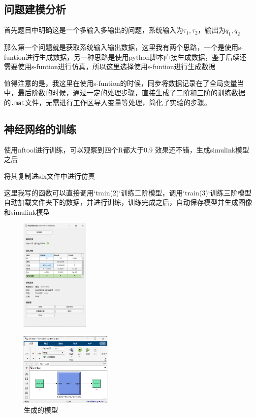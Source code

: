 \documentclass[12pt,a4paper,UTF8]{article}
\begin{document}
\subsection{问题建模分析}

首先题目中明确这是一个多输入多输出的问题，系统输入为$\tau_1, \tau_2$，输出为$q_1, q_2$

那么第一个问题就是获取系统输入输出数据，这里我有两个思路，一个是使用s-funtion进行生成数据，另一种思路是使用python脚本直接生成数据，鉴于后续还需要使用s-funtion进行仿真，所以这里选择使用s-funtion进行生成数据


值得注意的是，我这里在使用s-funtion的时候，同步将数据记录在了全局变量当中，最后阶数的时候，通过一定的处理步骤，直接生成了二阶和三阶的训练数据的\texttt{.mat}文件，无需进行工作区导入变量等处理，简化了实验的步骤。




\subsection{神经网络的训练}

使用nftool进行训练，可以观察到四个R都大于0.9 效果还不错，生成simulink模型之后

将其复制进slx文件中进行仿真

这里我写的函数可以直接调用`train(2)`训练二阶模型，调用`train(3)`训练三阶模型
自动加载文件夹下的数据，并进行训练，训练完成之后，自动保存模型并生成图像和simulink模型


\begin{figure}[htbp] \centering \includegraphics[width=0.3\textwidth]{figures/2024-12-24-00-01-06.png} \caption{  } \label{  }\end{figure}

\begin{figure}[htbp] \centering \includegraphics[width=0.4\textwidth]{figures/2024-12-24-00-01-14.png} \caption{生成的模型} \label{  }\end{figure}
\end{document}
